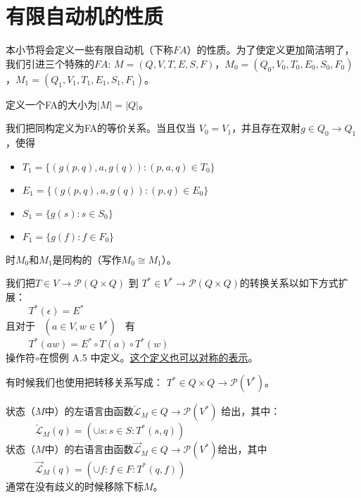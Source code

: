 \section{有限自动机的性质}
本小节将会定义一些有限自动机（下称$FA$）的性质。为了使定义更加简洁明了，我们引进三个特殊的$FA$: $M=(Q,V,T,E,S,F)$，$M_0=(Q_0,V_0,T_0,E_0,S_0,F_0)$，$ M_1=(Q_1,V_1,T_1,E_1,S_1,F_1) $。

\begin{definition}[$FA$的大小]
    定义一个FA的大小为$|M|=|Q|$。
\end{definition}

\begin{definition}
    我们把同构定义为FA的等价关系。当且仅当 $V_0=V_1$，并且存在双射$g\in Q_0 \longrightarrow Q_1$ ，使得
\begin{itemize}
    \item $T_1 = \{ (g(p,q),a,g(q)) : (p,a,q) \in T_0 \}$
    \item $E_1 = \{ (g(p,q),a,g(q)) : (p,q) \in E_0\}$
    \item $S_1 = \{ g(s):s\in S_0 \}$
    \item $F_1 = \{ g(f):f\in F_0 \}$
\end{itemize}
时$M_0$和$M_1$是同构的（写作$M_0 \cong M_1$）。
\end{definition}

\begin{definition}
    我们把$T \in V \longrightarrow \mathcal{P} (Q \times Q) $ 到 $ T^* \in V^* \longrightarrow \mathcal{P} (Q \times Q)  $的转换关系以如下方式扩展： \\
    \mbox{　　} $T^*(\epsilon) = E^*$ \\
    \mbox{且对于 } $(a\in V,w\in V^*)$ \mbox{ 有 }\\
    \mbox{　　} $ T^*(aw) = E^* \circ T(a) \circ T^*(w) $ \\
    操作符$\circ$在惯例 A.5 中定义。\uline{这个定义也可以对称的表示}。
\end{definition}


\begin{remark}
    有时候我们也使用把转移关系写成： $T^* \in Q \times Q \longrightarrow \mathcal{P}(V^*)$。
\end{remark}


\begin{definition}[左语言和右语言]
    状态（$M$中）的左语言由函数$ \overleftarrow{\mathcal{L}} _M \in Q \longrightarrow \mathcal{P}(V^*)$ 给出，其中：\\
    \mbox{　　}　$ \overleftarrow{\mathcal{L}}_M (q) = ( \cup s:s \in S : T^*(s,q) ) $ \\
    状态（$M$中）的右语言由函数$ \overrightarrow{\mathcal{L}} _M \in Q \longrightarrow \mathcal{P}(V^*)$给出，其中 \\
    \mbox{　　}　$ \overrightarrow{\mathcal{L}}_M (q) = ( \cup f:f \in F : T^*(q,f) ) $ \\
    通常在没有歧义的时候移除下标$M$。
\end{definition}


